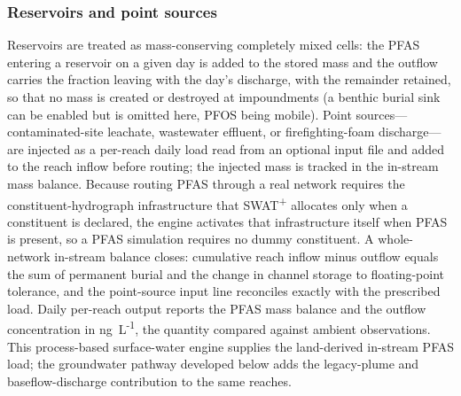 \subsubsection{Reservoirs and point sources}
Reservoirs are treated as mass-conserving completely mixed cells: the PFAS entering a reservoir on a given day is added to the stored mass and the outflow carries the fraction leaving with the day's discharge, with the remainder retained, so that no mass is created or destroyed at impoundments (a benthic burial sink can be enabled but is omitted here, PFOS being mobile). Point sources---contaminated-site leachate, wastewater effluent, or firefighting-foam discharge---are injected as a per-reach daily load read from an optional input file and added to the reach inflow before routing; the injected mass is tracked in the in-stream mass balance. Because routing PFAS through a real network requires the constituent-hydrograph infrastructure that SWAT\textsuperscript{+} allocates only when a constituent is declared, the engine activates that infrastructure itself when PFAS is present, so a PFAS simulation requires no dummy constituent. A whole-network in-stream balance closes: cumulative reach inflow minus outflow equals the sum of permanent burial and the change in channel storage to floating-point tolerance, and the point-source input line reconciles exactly with the prescribed load. Daily per-reach output reports the PFAS mass balance and the outflow concentration in ng~L\textsuperscript{-1}, the quantity compared against ambient observations. This process-based surface-water engine supplies the land-derived in-stream PFAS load; the groundwater pathway developed below adds the legacy-plume and baseflow-discharge contribution to the same reaches.

